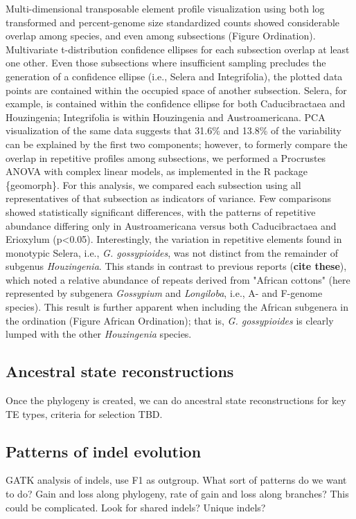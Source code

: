 \documentclass{bmcart}
\begin{document}
Multi-dimensional transposable element profile visualization using both log transformed and percent-genome size standardized counts showed considerable overlap among species, and even among subsections (Figure Ordination). Multivariate t-distribution confidence ellipses for each subsection overlap at least one other. Even those subsections where insufficient sampling precludes the generation of a confidence ellipse (i.e., Selera and Integrifolia), the plotted data points are contained within the occupied space of another subsection. Selera, for example, is contained within the confidence ellipse for both Caducibractaea and Houzingenia; Integrifolia is within Houzingenia and Austroamericana. PCA visualization of the same data suggests that 31.6\% and 13.8\% of the variability can be explained by the first two components; however, to formerly compare the overlap in repetitive profiles among subsections, we performed a Procrustes ANOVA with complex linear models, as implemented in the R package \{geomorph\}. For this analysis, we compared each subsection using all representatives of that subsection as indicators of variance. Few comparisons showed statistically significant differences, with the patterns of repetitive abundance differing only in Austroamericana versus both Caducibractaea and Erioxylum (p<0.05). Interestingly, the variation in repetitive elements found in monotypic Selera, i.e., \textit{G. gossypioides}, was not distinct from the remainder of subgenus \textit{Houzingenia}. This stands in contrast to previous reports (\textbf{cite these}), which noted a relative abundance of repeats derived from "African cottons" (here represented by subgenera \textit{Gossypium} and \textit{Longiloba}, i.e., A- and F-genome species). This result is further apparent when including the African subgenera in the ordination (Figure African Ordination); that is, \textit{G. gossypioides} is clearly lumped with the other \textit{Houzingenia} species. 

\subsection*{Ancestral state reconstructions}
Once the phylogeny is created, we can do ancestral state reconstructions for key TE types, criteria for selection TBD.

\subsection*{Patterns of indel evolution}
GATK analysis of indels, use F1 as outgroup. What sort of patterns do we want to do? Gain and loss along phylogeny, rate of gain and loss along branches? This could be complicated. Look for shared indels? Unique indels?
\end{document}
